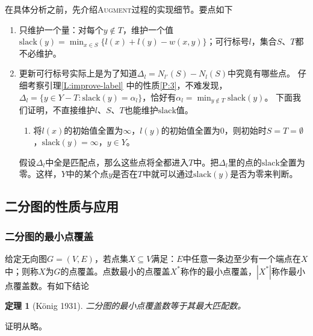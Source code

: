 \documentclass[a4paper]{ctexbook}
\newtheorem{theorem}{定理}[chapter] %
\newcommand{\slack}{\mathrm{slack}}
\begin{document}
  在具体分析之前，先介绍\textsc{Augment}过程的实现细节。要点如下
  \begin{enumerate}
    \item 只维护一个量：对每个$y\notin T$，维护一个值$\slack(y)=\min_{x\in S}\{l(x)+l(y)-w(x,y)\}$；可行标号$l$，集合$S$、$T$都不必维护。
    \item 更新可行标号实际上是为了知道$\Delta_l = N_{l'}(S)-N_{l}(S)$中究竟有哪些点。
    仔细考察引理\ref{L:improve-label} 中的性质\ref{P:3}，不难发现，
    $\Delta_l=\{y\in Y-T\colon\slack(y)=\alpha_{l}\}$，恰好有$\alpha_l=\min_{y\notin T}\slack(y)$。
    下面我们证明，不直接维护$l$、$S$、$T$也能维护$\slack$值。
    \begin{enumerate}
      \item 将$l(x)$的初始值全置为$\infty$，$l(y)$的初始值全置为$0$，则初始时$S=T=\emptyset$，$\slack(y)=\infty，y\in Y$。
    \end{enumerate}
    假设$\Delta_l$中全是匹配点，那么这些点将全都进入$T$中。把$\Delta_l$里的点的$\slack$全置为零。这样，$Y$中的某个点$y$是否在$T$中就可以通过$\slack(y)$是否为零来判断。
  \end{enumerate}

  \subsection{二分图的性质与应用}
  \subsubsection*{二分图的最小点覆盖}
  给定无向图$G=(V,E)$，若点集$X\subseteq V$满足：$E$中任意一条边至少有一个端点在$X$中；则称$X$为$G$的点覆盖。点数最小的点覆盖$X^*$称作的最小点覆盖，$|X^*|$称作最小点覆盖数。有如下结论
  \begin{theorem}[K\"{o}nig 1931]
    二分图的最小点覆盖数等于其最大匹配数。
  \end{theorem}
  证明从略。
\end{document}
